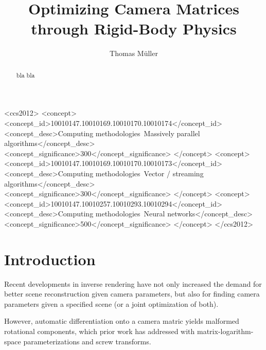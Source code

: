 \documentclass[acmtog,authorversion,nonacm]{acmart}
\begin{document}
\title{Optimizing Camera Matrices through Rigid-Body Physics}

\author{Thomas M\"uller}

\renewcommand\shortauthors{M\"uller}

\begin{CCSXML}
<ccs2012>
   <concept>
       <concept_id>10010147.10010169.10010170.10010174</concept_id>
       <concept_desc>Computing methodologies~Massively parallel algorithms</concept_desc>
       <concept_significance>300</concept_significance>
       </concept>
   <concept>
       <concept_id>10010147.10010169.10010170.10010173</concept_id>
       <concept_desc>Computing methodologies~Vector / streaming algorithms</concept_desc>
       <concept_significance>300</concept_significance>
       </concept>
   <concept>
       <concept_id>10010147.10010257.10010293.10010294</concept_id>
       <concept_desc>Computing methodologies~Neural networks</concept_desc>
       <concept_significance>500</concept_significance>
       </concept>
 </ccs2012>
\end{CCSXML}




\begin{abstract}
bla bla
\end{abstract}

\maketitle

\newpage
\section{Introduction} \label{Sec:Intro}

Recent developments in inverse rendering have not only increased the demand for better scene reconstruction given camera parameters, but also for finding camera parameters given a specified scene (or a joint optimization of both).

However, automatic differentiation onto a camera matric yields malformed rotational components, which prior work has addressed with matrix-logarithm-space parameterizations and screw transforms.
\end{document}

